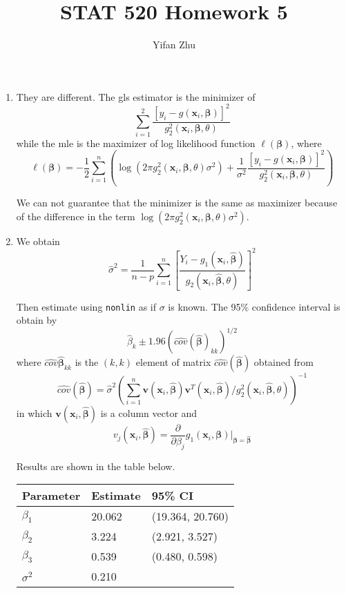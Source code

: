 \documentclass{article}
\begin{document}
	

	
	\title{STAT 520 Homework 5}
	\author{Yifan Zhu}
	\maketitle
	
	\begin{enumerate}[leftmargin = 0 em, label = \arabic*., font = \bfseries]

	\item 
	They are different. The gls estimator is the minimizer of 
	\[\sum_{i=1}^2 \frac{[y_i - g(\bm x_i, \bm \beta)]^2}{g_2^2 (\bm x_i, \bm \beta, \theta)}\]
	while the mle is the maximizer of log likelihood function $\ell(\bm \beta)$, where
	\[\ell (\bm \beta) = -\frac{1}{2} \sum_{i=1}^n \left(\log (2 \pi g_2^2 (\bm x_i, \bm \beta, \theta)\sigma^2) + \frac{1}{\sigma^2} \frac{[y_i - g(\bm x_i, \bm \beta)]^2}{g_2^2 (\bm x_i, \bm \beta, \theta)}\right)\]

	We can not guarantee that the minimizer is the same as maximizer because of the difference in the term $\log (2 \pi g_2^2 (\bm x_i, \bm \beta, \theta)\sigma^2)$. 


	\item 
	We obtain 
	\[\hat{\sigma}^2 = \frac{1}{n-p} \sum_{i=1}^n \left[\frac{Y_i - g_1 (\bm x_i , \hat{\bm \beta})}{g_2 (\bm x_i, \hat{\bm \beta}, \theta)}\right]^2\]

	Then estimate using \verb|nonlin| as if $\sigma$ is known. The 95\% confidence interval is obtain by
	\[\hat{\beta}_k \pm 1.96 (\widehat{cov}(\hat{\bm \beta})_{kk})^{1/2}\]
	where $\widehat{cov}{\hat{\bm \beta}_{kk}}$ is the $(k,k)$ element of matrix $\widehat{cov}(\hat{\bm \beta})$ obtained from 
	\[\widehat{cov}(\hat{\bm \beta}) = \hat \sigma^2 \left(\sum_{i=1}^n \bm v(\bm x_i, \hat{\bm \beta})\bm v^T(\bm x_i, \hat{\bm \beta})/g_2^2(\bm x_i, \hat{\bm \beta}, \theta)\right)^{-1}\]
	in which $\bm v(\bm x_i, \hat{\bm \beta})$ is a column vector and 
	\[v_j (\bm x_i, \hat{\bm \beta}) = \frac{\partial}{\partial \beta_j} g_1 (\bm x_i, \bm \beta)\bigg|_{\bm \beta = \hat{\bm \beta}}\]

	Results are shown in the table below.

	\begin{center}
	\begin{tabular}{lll}
		 \toprule
		 Parameter & Estimate & 95\% CI\\
		 \midrule
		 $\beta_1$ & 20.062 & (19.364, 20.760)\\
		 $\beta_2$ & 3.224 & (2.921, 3.527)\\
		 $\beta_3$ & 0.539 & (0.480, 0.598)\\
		 $\sigma^2$ & 0.210 & \\
		 \bottomrule
		\end{tabular}
	\end{center}


\end{enumerate}
\end{document}
